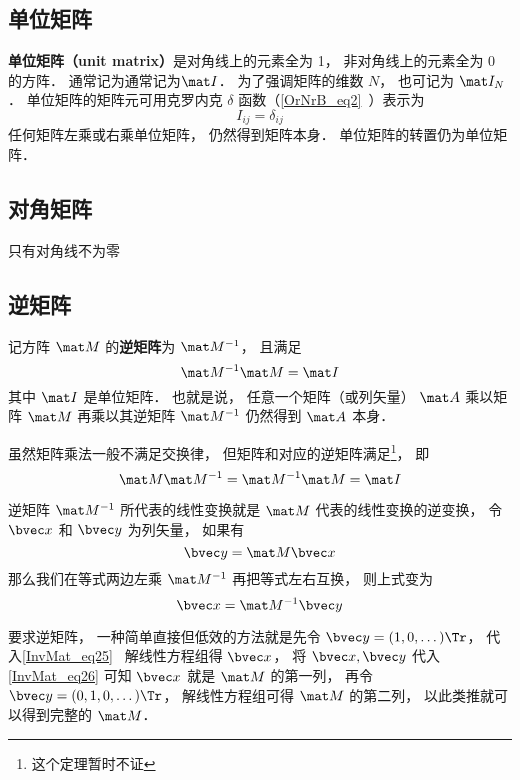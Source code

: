 \subsection{单位矩阵}
\textbf{单位矩阵（unit matrix）}是对角线上的元素全为 1， 非对角线上的元素全为 0 的方阵． 通常记为通常记为$\mat I$． 为了强调矩阵的维数 $N$， 也可记为 $\mat I_N$． 单位矩阵的矩阵元可用克罗内克 $\delta$ 函数（\autoref{OrNrB_eq2}~）表示为
\begin{equation}
I_{ij} = \delta_{ij}
\end{equation} 
任何矩阵左乘或右乘单位矩阵， 仍然得到矩阵本身． 单位矩阵的转置仍为单位矩阵．

\subsection{对角矩阵}
只有对角线不为零

\subsection{逆矩阵}
记方阵 $\mat M$ 的\textbf{逆矩阵}为 $\mat M^{-1}$， 且满足
\begin{equation}
\mat M^{-1} \mat M = \mat I
\end{equation}
其中 $\mat I$ 是单位矩阵． 也就是说， 任意一个矩阵（或列矢量） $\mat A$ 乘以矩阵 $\mat M$ 再乘以其逆矩阵 $\mat M^{-1}$ 仍然得到 $\mat A$ 本身．

虽然矩阵乘法一般不满足交换律， 但矩阵和对应的逆矩阵满足\footnote{这个定理暂时不证}， 即
\begin{equation}
\mat M\mat M^{-1} = \mat M^{-1} \mat M = \mat I
\end{equation}

逆矩阵 $\mat M^{-1}$ 所代表的线性变换就是 $\mat M$ 代表的线性变换的逆变换， 令 $\bvec x$ 和 $\bvec y$ 为列矢量， 如果有
\begin{equation}\label{Mat_eq25}
\bvec y = \mat M \bvec x
\end{equation}
那么我们在等式两边左乘 $\mat M^{-1}$ 再把等式左右互换， 则上式变为
\begin{equation}\label{Mat_eq26}
\bvec x = \mat M^{-1} \bvec y
\end{equation}

要求逆矩阵， 一种简单直接但低效的方法就是先令 $\bvec y = (1, 0, \dots)\Tr$， 代入\autoref{InvMat_eq25}~ 解线性方程组得 $\bvec x$， 将 $\bvec x, \bvec y$ 代入\autoref{InvMat_eq26} 可知 $\bvec x$ 就是 $\mat M$ 的第一列， 再令 $\bvec y = (0, 1, 0, \dots)\Tr$， 解线性方程组可得 $\mat M$ 的第二列， 以此类推就可以得到完整的 $\mat M$．
